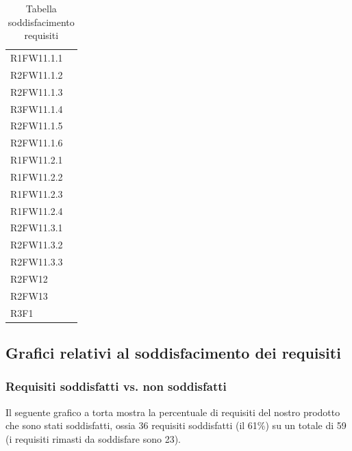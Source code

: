 \begin{table}[!htbp]
\begin{tabular}[t]{ m{}<{\centering}  m{}<{\centering} }
	R1FW11.1.1 & \So \\
		
	R2FW11.1.2 & \So \\
		
	R2FW11.1.3 & \So \\
	
	R3FW11.1.4& \Ns \\
	
	R2FW11.1.5& \Ns \\
	
	R2FW11.1.6 & \So \\
	
	R1FW11.2.1 & \So \\

	R1FW11.2.2 & \So \\	
	
	R1FW11.2.3 & \So \\
	
	R1FW11.2.4 & \So \\
	
	R2FW11.3.1 & \So \\
	
	R2FW11.3.2 & \So \\
	
	R2FW11.3.3 & \So \\

	R2FW12& \Ns \\

	R2FW13 & \Ns \\

	R3F1 & \Ns \\


\end{tabular}
\caption{Tabella soddisfacimento requisiti}
\end{table}

\newpage

\subsection{Grafici relativi al soddisfacimento dei requisiti}

\subsubsection{Requisiti soddisfatti vs. non soddisfatti}

Il seguente grafico a torta mostra la percentuale di requisiti del nostro prodotto che sono stati soddisfatti, ossia 36 requisiti soddisfatti (il 61\%) su un totale di 59 (i requisiti rimasti da soddisfare sono 23).

